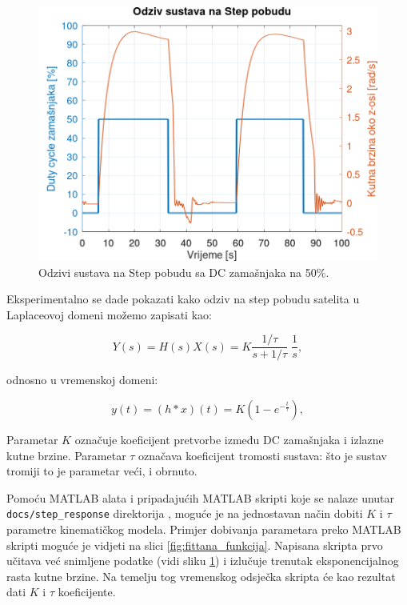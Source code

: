 \documentclass[times, utf8, diplomski, numeric]{templates/template}
\begin{document}
{{{            \begin{figure}[htb]
            \centering
            \includegraphics[width=1.0\textwidth]{other/step_response.png}
            \caption{Odzivi sustava na Step pobudu sa DC zamašnjaka na 50\%.}
            \label{fig:step_response}
            \end{figure}

            Eksperimentalno se dade pokazati kako odziv na step pobudu satelita u Laplaceovoj domeni možemo zapisati kao:

            \begin{equation}
                Y(s) = H(s)X(s) = K \frac{1/\tau}{s + 1/\tau} \; \frac{1}{s},
            \end{equation}

            odnosno u vremenskoj domeni:

            \begin{equation}
                y(t) = (h \ast x)(t) = K (1 - e^{-\frac{t}{\tau}}),
            \end{equation}

            Parametar $K$ označuje koeficijent pretvorbe između DC zamašnjaka i izlazne kutne brzine. Parametar $\tau$ označava koeficijent tromosti sustava: što je sustav tromiji to je parametar veći, i obrnuto.

            Pomoću MATLAB alata i pripadajućih MATLAB skripti koje se nalaze unutar \texttt{docs/step\_response} direktorija \cite{link_na_fit}, moguće je na jednostavan način dobiti $K$ i $\tau$ parametre kinematičkog modela. Primjer dobivanja parametara preko MATLAB skripti moguće je vidjeti na slici \ref{fig:fittana_funkcija}. Napisana skripta prvo učitava već snimljene podatke (vidi sliku \ref{fig:step_response}) i izlučuje trenutak eksponencijalnog rasta kutne brzine. Na temelju tog vremenskog odsječka skripta će kao rezultat dati $K$ i $\tau$ koeficijente. 

}}}
\end{document}

